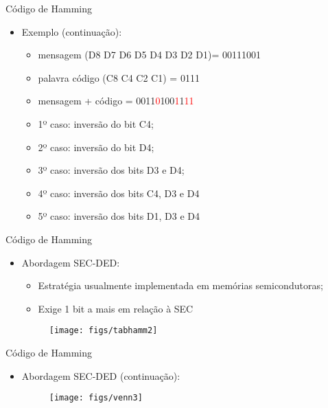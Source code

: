 \begin{slide}{Código de Hamming}
\begin{itemize}
   \item Exemplo (continuação): 
   \begin{itemize}
      \item mensagem (D8 D7 D6 D5 D4 D3 D2 D1)= 00111001
      \item palavra código (C8 C4 C2 C1) = 0111
      \item mensagem + código = 0011\textcolor{red}{0}100\textcolor{red}{1}1\textcolor{red}{1}\textcolor{red}{1}\pause
      \item 1º caso: inversão do bit C4; \pause 
      \item 2º caso: inversão do bit D4;\pause
      \item 3º caso: inversão dos bits D3 e D4;\pause 
      \item 4º caso: inversão dos bits C4, D3 e D4 \pause
      \item 5º caso: inversão dos bits D1, D3 e D4
   \end{itemize}
\end{itemize}
\end{slide}

\begin{slide}{Código de Hamming}
\begin{itemize}
   \item Abordagem SEC-DED: 
   \begin{itemize}
      \item Estratégia usualmente implementada em memórias semicondutoras;
      \item Exige 1 bit a mais em relação à SEC
   \end{itemize}
   \begin{figure}[h]
      \centering
      \texttt{[image: figs/tabhamm2]}
   \end{figure}
\end{itemize}
\end{slide}

\begin{slide}{Código de Hamming}
\begin{itemize}
   \item Abordagem SEC-DED (continuação): 
   \begin{figure}[h]
      \centering
      \texttt{[image: figs/venn3]}
   \end{figure}
\end{itemize}
\end{slide}

